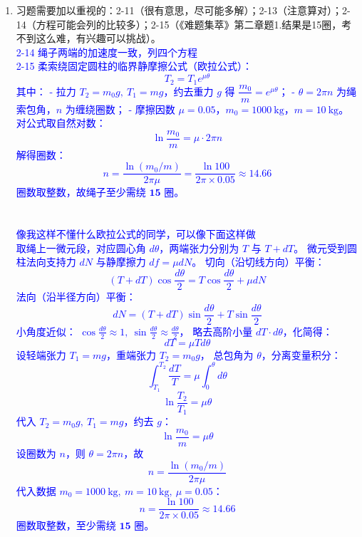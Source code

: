 \documentclass[12pt,a4paper]{article}
\begin{document}
\begin{enumerate}[label=\arabic*.,leftmargin=*]
    \item 习题需要加以重视的：2-11（很有意思，尽可能多解）；2-13（注意算对）；2-14（方程可能会列的比较多）；2-15（《难题集萃》第二章题1.结果是15圈，考不到这么难，有兴趣可以挑战）。\\
    \textcolor{blue}{2-14 绳子两端的加速度一致，列四个方程\\
    2-15
柔索绕固定圆柱的临界静摩擦公式（欧拉公式）：
\[
T_2 = T_1 e^{\mu \theta}
\]
其中：
- 拉力 \(T_2 = m_0 g,\ T_1 = m g\)，约去重力 \(g\) 得 \(\dfrac{m_0}{m} = e^{\mu\theta}\)；
- \(\theta = 2\pi n\) 为绳索包角，\(n\) 为缠绕圈数；
- 摩擦因数 \(\mu=0.05\)，\(m_0=1000\ \text{kg}\)，\(m=10\ \text{kg}\)。
对公式取自然对数：
\[
\ln\frac{m_0}{m} = \mu \cdot 2\pi n
\]
解得圈数：
\[
n = \frac{\ln(m_0/m)}{2\pi\mu}
= \frac{\ln100}{2\pi\times0.05}
\approx 14.66
\]
圈数取整数，故绳子至少需绕 \(\boldsymbol{15}\) 圈。
\\
\\
\\
像我这样不懂什么欧拉公式的同学，可以像下面这样做\\
取绳上一微元段，对应圆心角 $d\theta$，两端张力分别为 $T$ 与 $T+dT$。
微元受到圆柱法向支持力 $dN$ 与静摩擦力 $df=\mu dN$。
切向（沿切线方向）平衡：
\[
(T+dT)\cos\frac{d\theta}{2}
= T\cos\frac{d\theta}{2} + \mu dN
\]
法向（沿半径方向）平衡：
\[
dN
= (T+dT)\sin\frac{d\theta}{2} + T\sin\frac{d\theta}{2}
\]
小角度近似：
$\cos\frac{d\theta}{2}\approx1,\ \sin\frac{d\theta}{2}\approx\frac{d\theta}{2}$，
略去高阶小量 $dT\cdot d\theta$，化简得：
\[
dT = \mu T d\theta
\]
设轻端张力 $T_1=mg$，重端张力 $T_2=m_0g$，
总包角为 $\theta$，分离变量积分：
\[
\int_{T_1}^{T_2}\frac{dT}{T}
= \mu\int_0^\theta d\theta
\]
\[
\ln\frac{T_2}{T_1} = \mu\theta
\]
代入 $T_2=m_0g,\ T_1=mg$，约去 $g$：
\[
\ln\frac{m_0}{m} = \mu\theta
\]
设圈数为 $n$，则 $\theta=2\pi n$，故
\[
n = \frac{\ln(m_0/m)}{2\pi\mu}
\]
代入数据 $m_0=1000\ \text{kg},\ m=10\ \text{kg},\ \mu=0.05$：
\[
n=\frac{\ln 100}{2\pi\times 0.05}\approx 14.66
\]
圈数取整数，至少需绕 $\boldsymbol{15}$ 圈。
    }
\end{enumerate}
\end{document}
